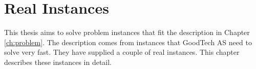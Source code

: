 \chapter{Real Instances}
\label{ch:instances}

This thesis aims to solve problem instances that fit the description in Chapter
\ref{ch:problem}.
The description comes from instances that GoodTech AS need to solve very fast.
They have supplied a couple of real instances.
This chapter describes these instances in detail.



